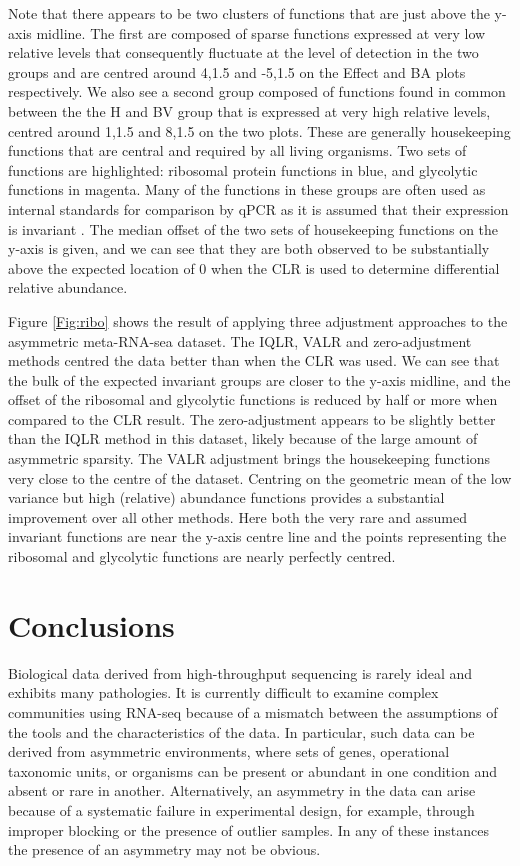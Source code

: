 \documentclass{bmcart}
\begin{document}
Note that there appears to be two clusters of functions that are just above the y-axis midline. The first are composed of sparse functions expressed at very low relative levels that consequently fluctuate at the level of detection in the two groups and are centred around 4,1.5 and -5,1.5 on the Effect and BA plots respectively.  We also see a second group composed of functions found in common between the the H and BV group that is  expressed at very high relative levels, centred around 1,1.5 and 8,1.5 on the two plots. These are generally housekeeping functions that are central and required by all living organisms. Two sets of functions are highlighted: ribosomal protein functions in blue, and glycolytic functions in magenta. Many of the functions in these groups are often used as internal standards for comparison by qPCR as it is assumed that their expression is invariant \cite{Scott:2010}. The median offset of the two sets of housekeeping functions  on the y-axis is given, and we can see that they are both observed to be substantially above the expected location of 0 when the CLR is used to determine differential relative abundance.   


Figure \ref{Fig:ribo} shows the result of applying  three adjustment approaches to the asymmetric meta-RNA-sea dataset. The IQLR, VALR and zero-adjustment methods centred the data  better than when the CLR was used. We can see that the bulk of the expected invariant groups are closer to the y-axis midline, and the offset of the ribosomal and glycolytic functions is reduced by half or more when compared to the CLR result. The zero-adjustment  appears to be slightly better than the IQLR method in this dataset, likely because of the large amount of asymmetric sparsity. The VALR adjustment brings the housekeeping functions very close to the centre of the dataset.  Centring on the geometric mean of the low variance but high (relative) abundance functions provides a substantial improvement over all other methods. Here both the very rare and assumed invariant functions are near the y-axis centre line and the points representing the ribosomal and glycolytic functions are nearly perfectly centred.

\section*{Conclusions}


Biological data derived from high-throughput sequencing is rarely ideal and exhibits many pathologies. It is currently difficult to examine complex communities using RNA-seq because of a mismatch between the assumptions of the tools and the characteristics of the data. In particular, such data can be derived from asymmetric environments, where sets of genes, operational taxonomic units, or organisms can be present or abundant in one condition and absent or rare in another. Alternatively, an asymmetry in the data can arise because of a systematic failure in experimental design, for example, through improper blocking or the presence of outlier samples. In any of these instances the presence of an asymmetry may not be obvious. 
\end{document}
